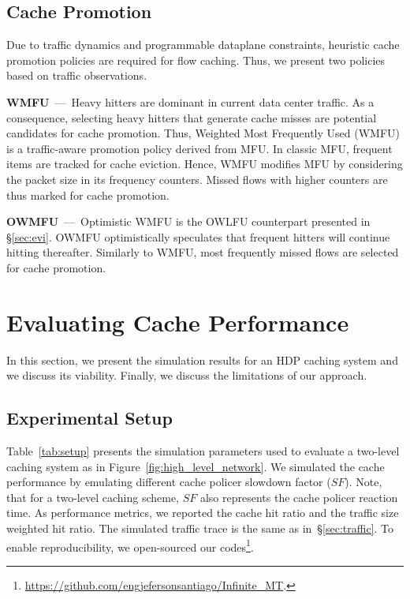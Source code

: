 \subsection{Cache Promotion}
Due to traffic dynamics and programmable dataplane constraints, heuristic cache promotion policies are required for flow caching.
Thus, we present two policies based on traffic observations.

\textbf{WMFU}~---~Heavy hitters are dominant in current data center traffic.
As a consequence, selecting heavy hitters that generate cache misses are potential candidates for cache promotion.
Thus, Weighted Most Frequently Used (WMFU) is a traffic-aware promotion policy derived from MFU.
In classic MFU, frequent items are tracked for cache eviction.
Hence, WMFU modifies MFU by considering the packet size in its frequency counters.
Missed flows with higher counters are thus marked for cache promotion.

\textbf{OWMFU}~---~Optimistic WMFU is the OWLFU counterpart presented in \S\ref{sec:evi}.
OWMFU optimistically speculates that frequent hitters will continue hitting thereafter.
Similarly to WMFU, most frequently missed flows are selected for cache promotion.



\section{Evaluating Cache Performance}\label{sec:cache_results}
In this section, we present the simulation results for an HDP caching system and we discuss its viability.
Finally, we discuss the limitations of our approach.

\subsection{Experimental Setup}
Table~\ref{tab:setup} presents the simulation parameters used to evaluate a two-level caching system as in Figure~\ref{fig:high_level_network}.
We simulated the cache performance by emulating different cache policer slowdown factor ($SF$).
Note, that for a two-level caching scheme, $SF$ also represents the cache policer reaction time.
As performance metrics, we reported the cache hit ratio and the traffic size weighted hit ratio.
The simulated traffic trace is the same as in~\S\ref{sec:traffic}.
To enable reproducibility, we open-sourced our codes\footnote{\url{https://github.com/engjefersonsantiago/Infinite_MT}.}.


